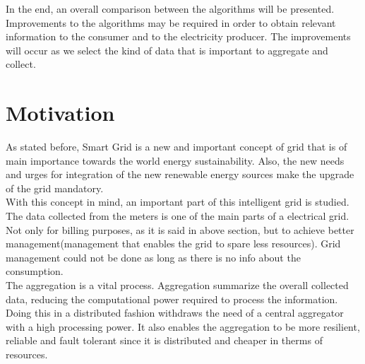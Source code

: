 In the end, an overall comparison between the algorithms will be presented. Improvements to the algorithms may be required in order to obtain relevant information to the consumer and to the electricity producer. The improvements will occur as we select the kind of data that is important to aggregate and collect.

\section{Motivation}
As stated before, Smart Grid is a new and important concept of grid that is of main importance towards the world energy sustainability. Also, the new needs and urges for integration of the new renewable energy sources make the upgrade of the grid mandatory.\\
With this concept in mind, an important part of this intelligent grid is studied. The data collected from the meters is one of the main parts of a electrical grid. Not only for billing purposes, as it is said in above section, but to achieve better management(management that enables the grid to spare less resources). Grid management could not be done as long as there is no info about the consumption.\\
The aggregation is a vital process. Aggregation summarize the overall collected data, reducing the computational power required to process the information. Doing this in a distributed fashion withdraws the need of a central aggregator with a high processing power. It also enables the aggregation to be more resilient, reliable and fault tolerant since it is distributed and  cheaper in therms of resources.



